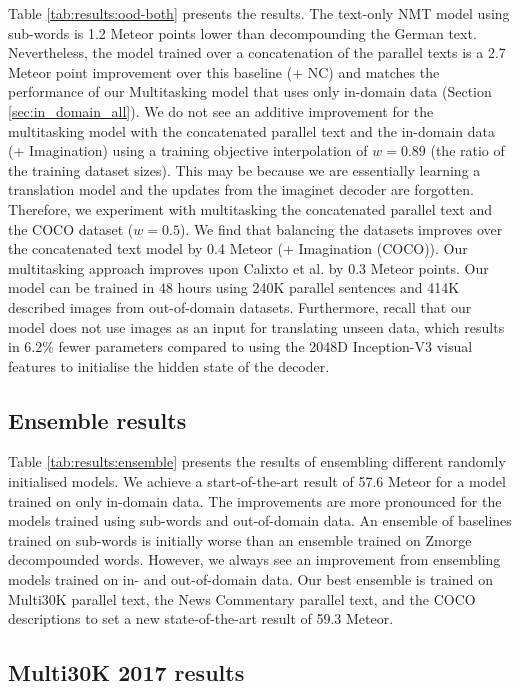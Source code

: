 Table \ref{tab:results:ood-both} presents the results. The text-only NMT model using sub-words is 1.2 Meteor points lower than decompounding the German text. Nevertheless, the model trained over a concatenation of the parallel texts is a 2.7 Meteor point improvement over this baseline (+ NC) and matches the performance of our Multitasking model that uses only in-domain data (Section \ref{sec:in_domain_all}). We do not see an additive improvement for the multitasking model with the concatenated parallel text and the in-domain data (+ Imagination) using a training objective interpolation of $w = 0.89$ (the ratio of the training dataset sizes). This may be because we are essentially learning a translation model and the updates from the {\sc imaginet} decoder are forgotten. Therefore, we experiment with multitasking the concatenated parallel text and the COCO dataset ($w=0.5$). We find that balancing the datasets improves over the concatenated text model by 0.4 Meteor (+ Imagination (COCO)). Our multitasking approach improves upon Calixto et al. by 0.3 Meteor points. Our model can be trained in 48 hours using 240K parallel sentences and 414K described images from out-of-domain datasets. Furthermore, recall that our model does not use images as an input for translating unseen data, which results in 6.2\% fewer parameters compared to using the 2048D Inception-V3 visual features to initialise the hidden state of the decoder.



\subsection{Ensemble results}

Table \ref{tab:results:ensemble} presents the results of ensembling different randomly initialised models. We achieve a start-of-the-art result of 57.6 Meteor for a model trained on only in-domain data. The improvements are more pronounced for the models trained using sub-words and out-of-domain data. An ensemble of baselines trained on sub-words is initially worse than an ensemble trained on Zmorge decompounded words. However, we always see an improvement from ensembling models trained on in- and out-of-domain data. Our best ensemble is trained on Multi30K parallel text, the News Commentary parallel text, and the COCO descriptions to set a new state-of-the-art result of 59.3 Meteor.

\subsection{Multi30K 2017 results}

